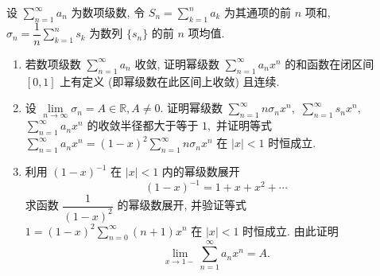 
\begin{question}[points = 12]
设 $\sum\limits_{n=1}^{\infty} a_n$ 为数项级数, 令 $S_n = \sum\limits_{k=1}^{n} a_k$ 为其通项的前 $n$ 项和, $\sigma_n = \dfrac{1}{n} \sum\limits_{k=1}^{n} s_k$ 为数列 $\{ s_n \}$ 的前 $n$ 项均值.

\begin{enumerate}
\item 若数项级数 $\sum\limits_{n=1}^{\infty} a_n$ 收敛, 证明幂级数 $\sum\limits_{n=1}^{\infty} a_nx^n$ 的和函数在闭区间 $[0, 1]$ 上有定义 (即幂级数在此区间上收敛) 且连续.
\item 设 $\lim\limits_{n\to\infty} \sigma_n = A \in \mathbb{R}, A \neq 0.$ 证明幂级数 $\sum\limits_{n=1}^{\infty} n\sigma_n x^n,$ $\sum\limits_{n=1}^{\infty} s_n x^n,$ $\sum\limits_{n=1}^{\infty} a_n x^n$ 的收敛半径都大于等于 $1,$ 并证明等式 $\sum\limits_{n=1}^{\infty} a_n x^n = (1-x)^2 \sum\limits_{n=1}^{\infty} n\sigma_n x^n$ 在 $\lvert x \rvert < 1$ 时恒成立.
\item 利用 $(1-x)^{-1}$ 在 $\lvert x \rvert < 1$ 内的幂级数展开
\[(1-x)^{-1} = 1 + x + x^2 + \cdots\]
求函数 $\dfrac{1}{(1-x)^2}$ 的幂级数展开, 并验证等式 $1 = (1-x)^2 \sum\limits_{n=0}^\infty (n+1)x^n$ 在 $\lvert x \rvert < 1$ 时恒成立. 由此证明
\[\lim\limits_{x \to 1-} \sum\limits_{n=1}^{\infty} a_n x^n = A.\]
\end{enumerate}

\end{question}

